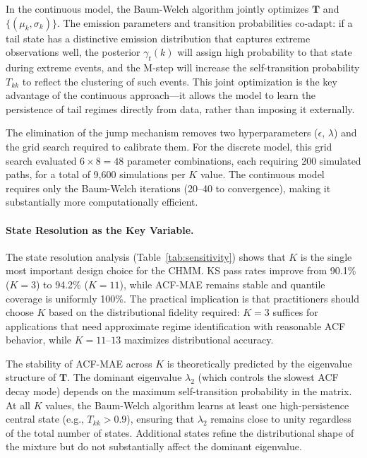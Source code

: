 In the continuous model, the Baum-Welch algorithm jointly optimizes $\mathbf{T}$ and $\{(\mu_k, \sigma_k)\}$.
The emission parameters and transition probabilities co-adapt: if a tail state has a distinctive emission distribution that captures extreme observations well, the posterior $\gamma_t(k)$ will assign high probability to that state during extreme events, and the M-step will increase the self-transition probability $T_{kk}$ to reflect the clustering of such events.
This joint optimization is the key advantage of the continuous approach---it allows the model to learn the persistence of tail regimes directly from data, rather than imposing it externally.

The elimination of the jump mechanism removes two hyperparameters ($\epsilon$, $\lambda$) and the grid search required to calibrate them.
For the discrete model, this grid search evaluated $6 \times 8 = 48$ parameter combinations, each requiring 200 simulated paths, for a total of 9,600 simulations per $K$ value.
The continuous model requires only the Baum-Welch iterations (20--40 to convergence), making it substantially more computationally efficient.

\paragraph{State Resolution as the Key Variable.}
The state resolution analysis (Table~\ref{tab:sensitivity}) shows that $K$ is the single most important design choice for the CHMM.
KS pass rates improve from 90.1\% ($K = 3$) to 94.2\% ($K = 11$), while ACF-MAE remains stable and quantile coverage is uniformly 100\%.
The practical implication is that practitioners should choose $K$ based on the distributional fidelity required: $K = 3$ suffices for applications that need approximate regime identification with reasonable ACF behavior, while $K = 11$--$13$ maximizes distributional accuracy.

The stability of ACF-MAE across $K$ is theoretically predicted by the eigenvalue structure of $\mathbf{T}$.
The dominant eigenvalue $\lambda_2$ (which controls the slowest ACF decay mode) depends on the maximum self-transition probability in the matrix.
At all $K$ values, the Baum-Welch algorithm learns at least one high-persistence central state (e.g., $T_{kk} > 0.9$), ensuring that $\lambda_2$ remains close to unity regardless of the total number of states.
Additional states refine the distributional shape of the mixture but do not substantially affect the dominant eigenvalue.

